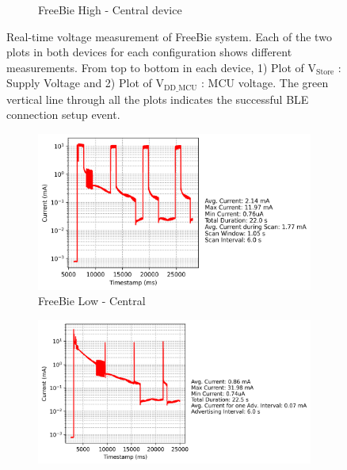 \begin{figure}[t]
\begin{subfigure}{0.5\linewidth}
        \caption{\scriptsize{FreeBie High - Central device}}
    \end{subfigure}         
    \caption{Real-time voltage measurement of FreeBie system. Each of the two plots in both devices for each configuration shows different measurements. From top to bottom in each device, 1) Plot of \(\text{V}_\text{Store}\) : Supply Voltage and 2) Plot of \(\text{V}_\text{DD\_MCU}\) : MCU voltage. The green vertical line through all the plots indicates the successful BLE connection setup event.}
    \label{fig:voltage_freebie}
\end{figure}
\begin{figure}[t]
    \begin{subfigure}{0.45\linewidth}
        \centering
        \includegraphics[width=\linewidth]{chapters/Results/Current vs Timestamp - FreeBie Central Low.png}
        \caption{FreeBie Low - Central}
        \label{fig:freebie_low_central}
    \end{subfigure}\hfill
    \begin{subfigure}{0.45\linewidth}
        \centering
        \includegraphics[width=\linewidth]{chapters/Results/Current vs Timestamp - FreeBie Peripheral Low.png}

\end{subfigure}
\end{figure}
